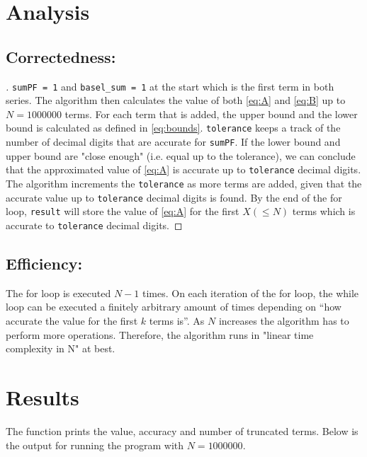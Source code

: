 \documentclass[11pt]{report}
\begin{document}


\section{Analysis}
\subsection{Correctedness:}
\begin{proof}[\unskip\nopunct]
\texttt{sumPF = 1} and \texttt{basel\_sum = 1} at the start which is the first term in both series. The algorithm then calculates the value of both \eqref{eq:A} and \eqref{eq:B} up to $N=1000000$ terms. For each term that is added, the upper bound and the lower bound is calculated as defined in \eqref{eq:bounds}. \texttt{tolerance} keeps a track of the number of decimal digits that are accurate for \texttt{sumPF}. If the lower bound and upper bound are "close enough" (i.e. equal up to the tolerance), we can conclude that the approximated value of \eqref{eq:A} is accurate up to \texttt{tolerance} decimal digits. \\

The algorithm increments the \texttt{tolerance} as more terms are added, given that the accurate value up to \texttt{tolerance} decimal digits is found. By the end of the for loop, \texttt{result} will store the value of \eqref{eq:A} for the first $X (\leq N)$ terms which is accurate to \texttt{tolerance} decimal digits.
\end{proof}

\subsection{Efficiency:}
The for loop is executed $N-1$ times. On each iteration of the for loop, the while loop can be executed a finitely arbitrary amount of times depending on ``how accurate the value for the first $k$ terms is''. As $N$ increases the algorithm has to perform more operations. Therefore, the algorithm runs in "linear time complexity in N" at best.

\section{Results}
The function prints the value, accuracy and number of truncated terms. Below is the output for running the program with $N=1000000$.
\end{document}
